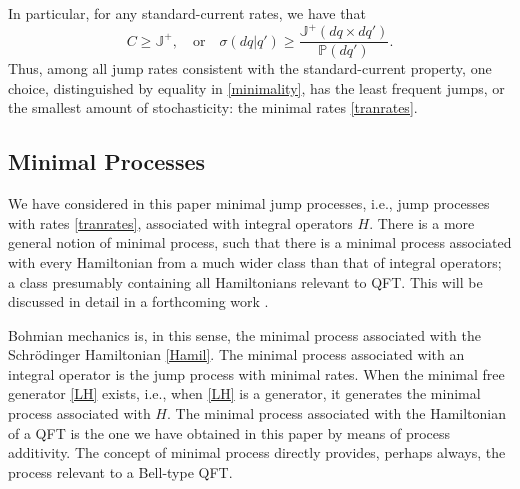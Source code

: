 \documentclass[12pt]{article}
\newcommand{\1}{\mathbf{1}} %
\newcommand{\measure}{\mathbb{P}} %
\newcommand{\current}{\mathbb{J}}
\begin{document}
In particular, for any standard-current rates, we have that
\begin{equation}\label{minimality}
   C \geq \current^+, \quad \text{or} \quad \sigma(dq|q') \geq
   \frac{\current^+(dq \times dq')}{\measure(dq')}.
\end{equation}
Thus, among all jump rates consistent with the standard-current
property, one choice, distinguished by equality in \eqref{minimality},
has the least frequent jumps, or the smallest amount of stochasticity:
the minimal rates \eqref{tranrates}.


\subsection{Minimal Processes}
\label{sec:mini}

We have considered in this paper minimal jump processes, i.e., jump
processes with rates \eqref{tranrates}, associated with integral
operators $H$. There is a more general notion of minimal process, such
that there is a minimal process associated with every Hamiltonian from
a much wider class than that of integral operators; a class presumably
containing all Hamiltonians relevant to QFT. This will be discussed in
detail in a forthcoming work \cite{crea3}.

Bohmian mechanics is, in this sense, the minimal process associated with
the Schr\"odin\-ger Hamiltonian \eqref{Hamil}. The minimal process
associated
with an integral operator is the jump process with minimal rates. When 
the
minimal free generator \eqref{LH} exists, i.e., when \eqref{LH} is a
generator, it generates the minimal process associated with $H$. The
minimal process associated with the Hamiltonian of a QFT is the one we
have
obtained in this paper by means of process additivity. The concept of
minimal process directly provides, perhaps always,  the process relevant
to a Bell-type QFT.
\end{document}
